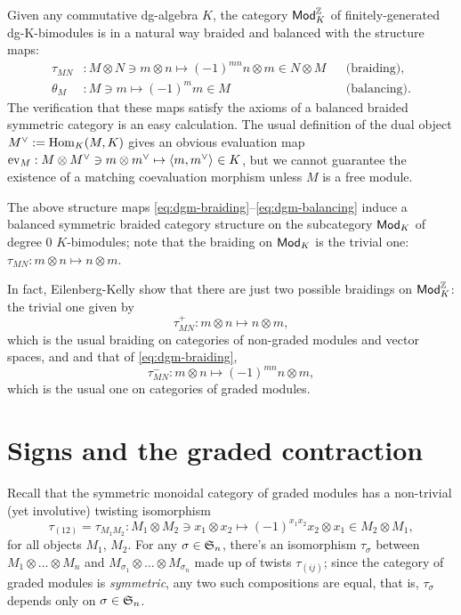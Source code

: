 Given any commutative dg-algebra $K$, the category $\mathsf{Mod}_K^{\mathbb{Z}}$ of
finitely-generated dg-K-bimodules is in a natural way braided and
balanced with the structure maps:
\begin{align}
  \label{eq:dgm-braiding}
  \tau_{MN} &: M \otimes N \ni m\otimes n \mapsto (-1)^{mn}n\otimes m \in N \otimes M
  &&
  \text{(braiding),}
  \\
  \label{eq:dgm-balancing}
  \theta_M &: M \ni m \mapsto (-1)^mm \in M
  &&
  \text{(balancing).}
\end{align}
The verification that these maps satisfy the axioms of a balanced
braided symmetric category is an easy calculation.  The usual
definition of the dual object $\rdl{M} := \Hom_K(M, K)$ gives an
obvious evaluation map $\ev_M : M \otimes \rdl{M} \ni m \otimes \rdl{m} \mapsto
\pairing{m}{\rdl{m}} \in K$, but we cannot guarantee the existence of a
matching coevaluation morphism unless $M$ is a free module.

The above structure maps
\eqref{eq:dgm-braiding}--\eqref{eq:dgm-balancing} induce a balanced
symmetric braided category structure on the subcategory $\mathsf{Mod}_K$ of
degree $0$ $K$-bimodules; note that the braiding on $\mathsf{Mod}_K$ is the
trivial one: $\tau_{MN}: m\otimes n \mapsto n\otimes m$.
\begin{remark}
  In fact, Eilenberg-Kelly \cite{eilenberg-kelly;monoidal-categories}
  show that there are just two possible braidings on $\mathsf{Mod}_K^{\mathbb{Z}}$:
  the trivial one given by
  \begin{equation*}
    \tau_{MN}^+ : m\otimes n \mapsto n\otimes m,
  \end{equation*}
  which is the usual braiding on categories of non-graded modules and
  vector spaces, and and that of \eqref{eq:dgm-braiding},
  \begin{equation*}
    \tau_{MN}^- : m\otimes n \mapsto (-1)^{mn} n\otimes m,
  \end{equation*}
  which is the usual one on categories of graded modules.
\end{remark}


\section{Signs and the graded contraction}
\label{sec:signs}

Recall that the symmetric monoidal category of graded modules has a
non-trivial (yet involutive) twisting isomorphism
\begin{equation*}
\tau_{(12)} = \tau_{M_1M_2} : M_1
\otimes M_2 \ni x_1\otimes x_2 \mapsto (-1)^{x_1x_2} x_2\otimes x_1
\in M_2\otimes M_1,
\end{equation*}
for all objects $M_1$, $M_2$. For any
$\sigma\in\mathfrak{S}_{n}$, there's an isomorphism $\tau_\sigma$ between
$M_1\otimes \dots \otimes M_n$ and $M_{\sigma_1} \otimes \dots
\otimes M_{\sigma_n}$ made up of twists $\tau_{(ij)}$; since the
category of graded modules is \emph{symmetric}, any two such
compositions are equal, that is, $\tau_\sigma$ depends only on
$\sigma\in\mathfrak{S}_{n}$.


